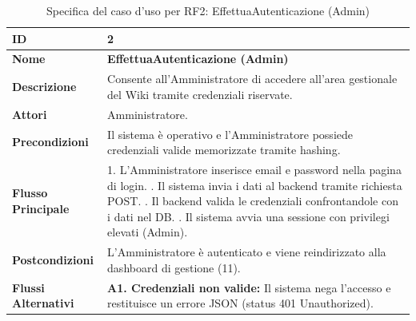\begin{table}[H]
    \small
    \caption{Specifica del caso d'uso per RF2: EffettuaAutenticazione (Admin)}
    \label{tab:spec_uc2_admin}
    \begin{tabularx}{\textwidth}{@{}l X@{}}
        \toprule
        \textbf{ID} & 2 \\
        \midrule
        \textbf{Nome} & \textbf{EffettuaAutenticazione (Admin)} \\
        \midrule
        \textbf{Descrizione} & Consente all'Amministratore di accedere all'area gestionale del Wiki tramite credenziali riservate. \\
        \midrule
        \textbf{Attori} & Amministratore. \\
        \midrule
        \textbf{Precondizioni} & Il sistema è operativo e l'Amministratore possiede credenziali valide memorizzate tramite hashing. \\
        \midrule
        \textbf{Flusso Principale} & 
        1. L'Amministratore inserisce email e password nella pagina di login. \newline
        2. Il sistema invia i dati al backend tramite richiesta POST. \newline
        3. Il backend valida le credenziali confrontandole con i dati nel DB. \newline
        4. Il sistema avvia una sessione con privilegi elevati (Admin). \\
        \midrule
        \textbf{Postcondizioni} & L'Amministratore è autenticato e viene reindirizzato alla dashboard di gestione (11). \\
        \midrule
        \textbf{Flussi Alternativi} & \textbf{A1. Credenziali non valide:} Il sistema nega l'accesso e restituisce un errore JSON (status 401 Unauthorized). \\
        \bottomrule
    \end{tabularx}
\end{table}




